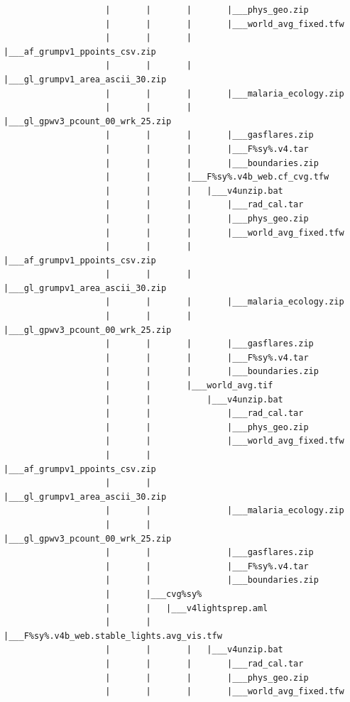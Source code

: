 \documentclass[
]{book}
\begin{document}
\begin{verbatim}
                    |       |       |       |___phys_geo.zip
                    |       |       |       |___world_avg_fixed.tfw
                    |       |       |       |___af_grumpv1_ppoints_csv.zip
                    |       |       |       |___gl_grumpv1_area_ascii_30.zip
                    |       |       |       |___malaria_ecology.zip
                    |       |       |       |___gl_gpwv3_pcount_00_wrk_25.zip
                    |       |       |       |___gasflares.zip
                    |       |       |       |___F%sy%.v4.tar
                    |       |       |       |___boundaries.zip
                    |       |       |___F%sy%.v4b_web.cf_cvg.tfw
                    |       |       |   |___v4unzip.bat
                    |       |       |       |___rad_cal.tar
                    |       |       |       |___phys_geo.zip
                    |       |       |       |___world_avg_fixed.tfw
                    |       |       |       |___af_grumpv1_ppoints_csv.zip
                    |       |       |       |___gl_grumpv1_area_ascii_30.zip
                    |       |       |       |___malaria_ecology.zip
                    |       |       |       |___gl_gpwv3_pcount_00_wrk_25.zip
                    |       |       |       |___gasflares.zip
                    |       |       |       |___F%sy%.v4.tar
                    |       |       |       |___boundaries.zip
                    |       |       |___world_avg.tif
                    |       |           |___v4unzip.bat
                    |       |               |___rad_cal.tar
                    |       |               |___phys_geo.zip
                    |       |               |___world_avg_fixed.tfw
                    |       |               |___af_grumpv1_ppoints_csv.zip
                    |       |               |___gl_grumpv1_area_ascii_30.zip
                    |       |               |___malaria_ecology.zip
                    |       |               |___gl_gpwv3_pcount_00_wrk_25.zip
                    |       |               |___gasflares.zip
                    |       |               |___F%sy%.v4.tar
                    |       |               |___boundaries.zip
                    |       |___cvg%sy%
                    |       |   |___v4lightsprep.aml
                    |       |       |___F%sy%.v4b_web.stable_lights.avg_vis.tfw
                    |       |       |   |___v4unzip.bat
                    |       |       |       |___rad_cal.tar
                    |       |       |       |___phys_geo.zip
                    |       |       |       |___world_avg_fixed.tfw

\end{verbatim}
\end{document}
